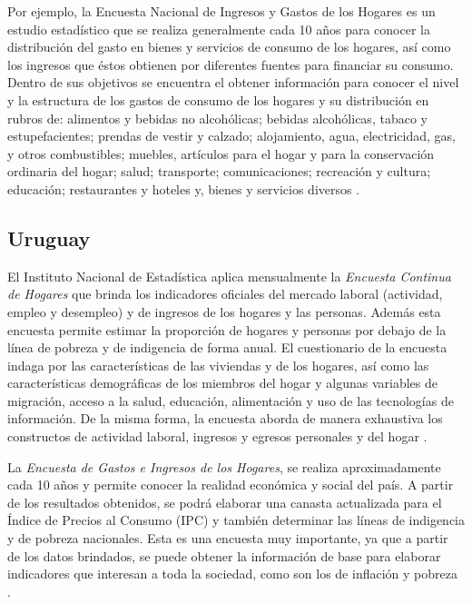 \documentclass[12pt,spanish,]{book}
\begin{document}
Por ejemplo, la Encuesta Nacional de Ingresos y Gastos de los Hogares es un estudio estadístico que se realiza generalmente cada 10 años para conocer la distribución del gasto en bienes y servicios de consumo de los hogares, así como los ingresos que éstos obtienen por diferentes fuentes para financiar su consumo. Dentro de sus objetivos se encuentra el obtener información para conocer el nivel y la estructura de los gastos de consumo de los hogares y su distribución en rubros de: alimentos y bebidas no alcohólicas; bebidas alcohólicas, tabaco y estupefacientes; prendas de vestir y calzado; alojamiento, agua, electricidad, gas, y otros combustibles; muebles, artículos para el hogar y para la conservación ordinaria del hogar; salud; transporte; comunicaciones; recreación y cultura; educación; restaurantes y hoteles y, bienes y servicios diversos \autocite{ONE2-DO}.

\hypertarget{uruguay}{%
\subsection*{Uruguay}\label{uruguay}}

El Instituto Nacional de Estadística aplica mensualmente la \emph{Encuesta Continua de Hogares} que brinda los indicadores oficiales del mercado laboral (actividad, empleo y desempleo) y de ingresos de los hogares y las personas. Además esta encuesta permite estimar la proporción de hogares y personas por debajo de la línea de pobreza y de indigencia de forma anual. El cuestionario de la encuesta indaga por las características de las viviendas y de los hogares, así como las características demográficas de los miembros del hogar y algunas variables de migración, acceso a la salud, educación, alimentación y uso de las tecnologías de información. De la misma forma, la encuesta aborda de manera exhaustiva los constructos de actividad laboral, ingresos y egresos personales y del hogar \autocite{INE-UY_2016}.

La \emph{Encuesta de Gastos e Ingresos de los Hogares}, se realiza aproximadamente cada 10 años y permite conocer la realidad económica y social del país. A partir de los resultados obtenidos, se podrá elaborar una canasta actualizada para el Índice de Precios al Consumo (IPC) y también determinar las líneas de indigencia y de pobreza nacionales. Esta es una encuesta muy importante, ya que a partir de los datos brindados, se puede obtener la información de base para elaborar indicadores que interesan a toda la sociedad, como son los de inflación y pobreza \autocite{INE2-UY}.
\end{document}
